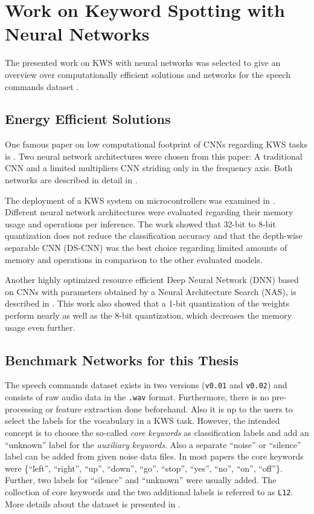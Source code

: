 
\section{Work on Keyword Spotting with Neural Networks}\label{sec:prev_kws}
The presented work on KWS with neural networks was selected to give an overview over computationally efficient solutions and networks for the speech commands dataset \cite{Warden2018}.



\subsection{Energy Efficient Solutions}
One famous paper on low computational footprint of CNNs regarding KWS tasks is \cite{Sainath2015}.
Two neural network architectures were chosen from this paper: A traditional CNN and a limited multipliers CNN striding only in the frequency axis.
Both networks are described in detail in .

The deployment of a KWS system on microcontrollers was examined in \cite{Zhang2017}.
Different neural network architectures were evaluated regarding their memory usage and operations per inference.
The work showed that 32-bit to 8-bit quantization does not reduce the classification accuracy and that the depth-wise separable CNN (DS-CNN) was the best choice regarding limited amounts of memory and operations in comparison to the other evaluated models.

Another highly optimized resource efficient Deep Neural Network (DNN) based on CNNs with parameters obtained by a Neural Architecture Search (NAS), is described in \cite{Peter2020}.
This work also showed that a 1-bit quantization of the weights perform nearly as well as the 8-bit quantization, which decreases the memory usage even further.



\subsection{Benchmark Networks for this Thesis}\label{sec:prev_kws_benchmark}
The speech commands dataset \cite{Warden2018} exists in two versions (\texttt{v0.01} and \texttt{v0.02}) and consists of raw audio data in the \texttt{.wav} format.
Furthermore, there is no pre-processing or feature extraction done beforehand.
Also it is up to the users to select the labels for the vocabulary in a KWS task.
However, the intended concept is to choose the so-called \emph{core keywords} as classification labels and add an \enquote{unknown} label for the \emph{auxiliary keywords}.
Also a separate \enquote{noise} or \enquote{silence} label can be added from given noise data files.
In most papers the core keywords were \{\enquote{left},  \enquote{right}, \enquote{up}, \enquote{down}, \enquote{go}, \enquote{stop}, \enquote{yes}, \enquote{no}, \enquote{on}, \enquote{off}\}.
Further, two labels for \enquote{silence} and \enquote{unknown} were usually added.
The collection of core keywords and the two additional labels is referred to as \texttt{L12}.
More details about the dataset is presented in .


